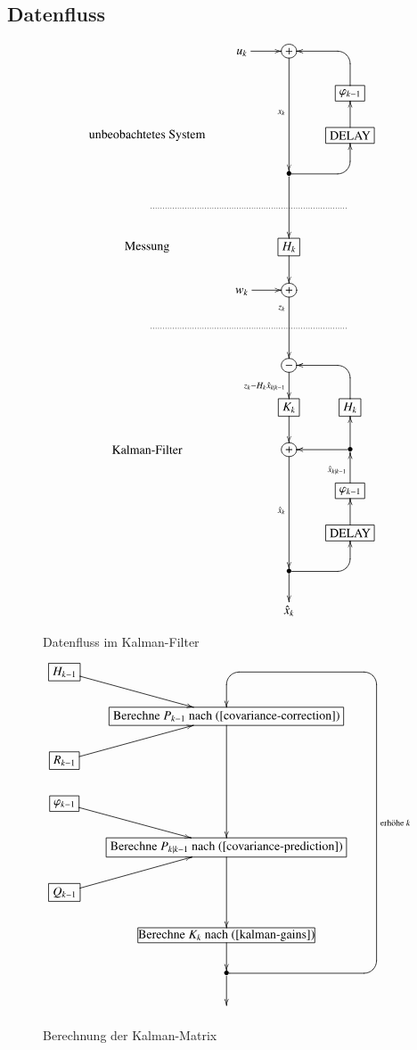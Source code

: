 \subsection{Datenfluss}
\begin{figure}
\[
\xymatrix @-1mm {
&u_k\ar[r]& *+[o][F]{+}\ar[ddd]_{x_k}&                               \\
&&                   & *+[F]{\varphi_{k-1}}\ar `u^l[ul] [ul]          \\
*\txt{unbeobachtetes System}&&                   & *+[F]\txt{DELAY} \ar[u]       \\
&& *{\bullet}\ar[dd]\ar `r^u[ru] [ru]         &                        \\
\ar@{.}[rrr]&&&\\
*\txt{Messung}&& *+[F]{H_k}\ar[d] & \\
&w_k\ar[r]& *+[o][F]{+}\ar[dd]_<<<<{z_k} &                      \\
\ar@{.}[rrr]&&&\\
&& *+[o][F]{-}\ar[d]_{z_k-H_k \hat x_{k|k-1}} &                               \\
&& *+[F]{K_k}\ar[d]  & *+[F]{H_k}\ar `u^l[ul] [ul]   \\
*\txt{Kalman-Filter}&& *+[o][F]{+}\ar[ddd]_{\hat x_k}  & *{\bullet}\ar[u]\ar[l]\\
&&                   & *+[F]{\varphi_{k-1}}\ar[u]^{\hat x_{k|k-1}}            \\
&&                   & *+[F]\txt{DELAY} \ar[u]       \\
&& *{\bullet}\ar `r^u[ru] [ru] \ar[d]&                     \\
&& \hat x_k          &                               \\
}\]
\caption{Datenfluss im Kalman-Filter\label{datenfluss}}
\end{figure}
\begin{figure}
\[
\xymatrix @-1mm {
*+[F]{H_{k-1}}\ar [rd] & & \\
&*+[F]\txt{Berechne $P_{k-1}$ nach (\ref{covariance-correction})}\ar[ddd]&\\
*+[F]{R_{k-1}}\ar[ur] & & \\
*+[F]{\varphi_{k-1}}\ar[dr] & & \\
&*+[F]\txt{Berechne $P_{k|k-1}$ nach (\ref{covariance-prediction})} \ar[dd] & &\\
*+[F]{Q_{k-1}} \ar[ur] & & \\
&*[F]\txt{\strut Berechne $K_k$ nach (\ref{kalman-gains})} \ar[d] && \\
&*{\bullet} \ar `r^u[r] `u^l[ruuuuuuu]_{\text{erhöhe }k} `l^d[uuuuuuu] [uuuuuu] \ar[d]&&\\
&&&\\
}\]
\caption{Berechnung der Kalman-Matrix\label{k-berechnung}}
\end{figure}
